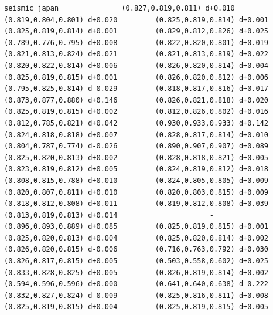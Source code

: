 \documentclass[11pt, letterpaper, openany]{book}
\begin{document}
\begin{empiricalbox}
\begin{lstlisting}[style=terminal]
seismic_japan               (0.827,0.819,0.811) d+0.010         (0.819,0.804,0.801) d+0.020         (0.825,0.819,0.814) d+0.001         (0.825,0.819,0.814) d+0.001         (0.829,0.812,0.826) d+0.025         (0.789,0.776,0.795) d+0.008         (0.822,0.820,0.801) d+0.019         (0.821,0.813,0.824) d+0.021         (0.821,0.813,0.819) d+0.022         (0.820,0.822,0.814) d+0.006         (0.826,0.820,0.814) d+0.004         (0.825,0.819,0.815) d+0.001         (0.826,0.820,0.812) d+0.006         (0.795,0.825,0.814) d-0.029         (0.818,0.817,0.816) d+0.017         (0.873,0.877,0.880) d+0.146         (0.826,0.821,0.818) d+0.020         (0.825,0.819,0.815) d+0.002         (0.812,0.826,0.802) d+0.016         (0.812,0.785,0.821) d+0.042         (0.930,0.933,0.933) d+0.142         (0.824,0.818,0.818) d+0.007         (0.828,0.817,0.814) d+0.010         (0.804,0.787,0.774) d-0.026         (0.890,0.907,0.907) d+0.089         (0.825,0.820,0.813) d+0.002         (0.828,0.818,0.821) d+0.005         (0.823,0.819,0.812) d+0.005         (0.824,0.819,0.812) d+0.018         (0.808,0.815,0.788) d+0.010         (0.824,0.805,0.805) d+0.009         (0.820,0.807,0.811) d+0.010         (0.820,0.803,0.815) d+0.009         (0.818,0.812,0.808) d+0.011         (0.819,0.812,0.808) d+0.039         (0.813,0.819,0.813) d+0.014                      -                      (0.896,0.893,0.889) d+0.085         (0.825,0.819,0.815) d+0.001         (0.825,0.820,0.813) d+0.004         (0.825,0.820,0.814) d+0.002         (0.826,0.820,0.815) d-0.006         (0.716,0.763,0.792) d+0.030         (0.826,0.817,0.815) d+0.005         (0.503,0.558,0.602) d+0.025         (0.833,0.828,0.825) d+0.005         (0.826,0.819,0.814) d+0.002         (0.594,0.596,0.596) d+0.000         (0.641,0.640,0.638) d-0.222         (0.832,0.827,0.824) d-0.009         (0.825,0.816,0.811) d+0.008         (0.825,0.819,0.815) d+0.004         (0.825,0.819,0.815) d+0.005     

\end{lstlisting}
\end{empiricalbox}
\end{document}
